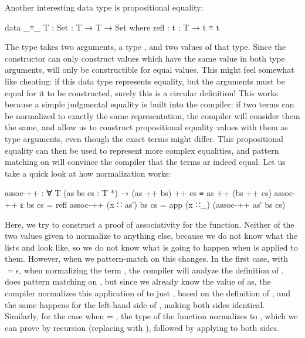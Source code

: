 		Another interesting data type is propositional equality:

		\begin{code}
			data _≡_ {T : Set} : T → T → Set where
			  refl : {t : T} → t ≡ t
		\end{code}

		The type  takes two arguments, a type , and two
		values of that type. Since the constructor can only construct values
		which have the same value in both type arguments,  will
		only be constructible for equal values. This might feel somewhat like
		cheating: if this data type represents equality, but the arguments must
		be equal for it to be constructed, surely this is a circular
		definition! This works because a simple judgmental equality is built
		into the compiler: if two terms can be normalized to exactly the same
		representation, the compiler will consider them the same, and allow us
		to construct propositional equality values with them as type arguments,
		even though the exact terms might differ. This propositional equality
		can then be used to represent more complex equalities, and pattern
		matching on  will convince the compiler that the terms ar
		indeed equal. Let us take a quick look at how normalization works:

		\begin{code}
			assoc-++ : ∀ {T} (as bs cs : T *) → (as ++ bs) ++ cs ≡ as ++ (bs ++ cs)
			assoc-++ ε          bs cs = refl
			assoc-++ (x ∷ as′)  bs cs = app (x ∷_) (assoc-++ as′ bs cs)
		\end{code}

	 	Here, we try to construct a proof of associativity for the
	 	\codett{\_++\_} function. Neither of the two values given to
	 	 normalize to anything else, because we do not know what
	 	the lists  and  look like, so we do not know
	 	what is going to happen when \codett{\_++\_} is applied to them.
	 	However, when we pattern-match on  this changes. In the
	 	first case, with  $=\epsilon$, when normalizing the term
	 	, the compiler will analyze the definition of
	 	\codett{\_++\_}. \codett{\_++\_} does pattern matching on ,
	 	but since we already know the value of as, the compiler normalizes this
	 	application of \codett{\_++\_} to just , based on the
	 	definition of \codett{\_++\_}, and the same happens for the left-hand
	 	side of , making both sides identical.  Similarly, for
	 	the case when  = , the type of the function
	 	normalizes to , which we can prove by recursion (replacing  with
	 	), followed by applying  to both sides.
